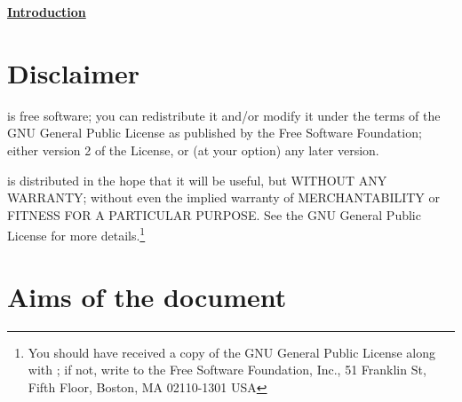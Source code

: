 %
%
%
%
%
%
%
%
\begin{center}
\underline{{\Huge \textbf{Introduction}}}
\end{center}

\vspace{1cm}

\section{Disclaimer}
\CS is free software; you can redistribute it
and/or modify it under the terms of the GNU General Public License
as published by the Free Software Foundation; either version 2 of
the License, or (at your option) any later version.

\CS is distributed in the hope that it will be
useful, but WITHOUT ANY WARRANTY; without even the implied warranty
of MERCHANTABILITY or FITNESS FOR A PARTICULAR PURPOSE.  See the
GNU General Public License for more details.\footnote{You should have
received a copy of the GNU General Public License
along with \CS; if not, write to the
Free Software Foundation, Inc.,
51 Franklin St, Fifth Floor,
Boston, MA  02110-1301  USA}

\section{Aims of the document}

